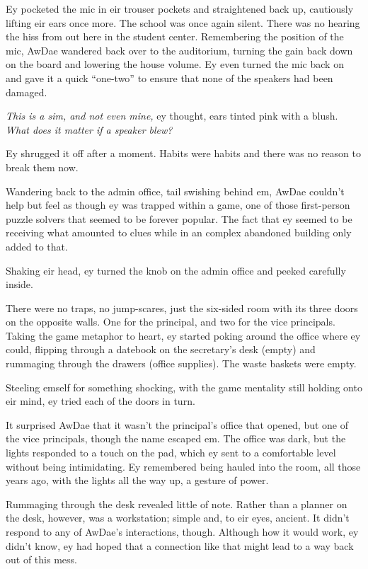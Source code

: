Ey pocketed the mic in eir trouser pockets and straightened back up, cautiously lifting eir ears once more. The school was once again silent. There was no hearing the hiss from out here in the student center. Remembering the position of the mic, AwDae wandered back over to the auditorium, turning the gain back down on the board and lowering the house volume. Ey even turned the mic back on and gave it a quick ``one-two'' to ensure that none of the speakers had been damaged.

\emph{This is a sim, and not even mine,} ey thought, ears tinted pink with a blush. \emph{What does it matter if a speaker blew?}

Ey shrugged it off after a moment. Habits were habits and there was no reason to break them now.

Wandering back to the admin office, tail swishing behind em, AwDae couldn't help but feel as though ey was trapped within a game, one of those first-person puzzle solvers that seemed to be forever popular. The fact that ey seemed to be receiving what amounted to clues while in an complex abandoned building only added to that.

Shaking eir head, ey turned the knob on the admin office and peeked carefully inside.

There were no traps, no jump-scares, just the six-sided room with its three doors on the opposite walls. One for the principal, and two for the vice principals. Taking the game metaphor to heart, ey started poking around the office where ey could, flipping through a datebook on the secretary's desk (empty) and rummaging through the drawers (office supplies). The waste baskets were empty.

Steeling emself for something shocking, with the game mentality still holding onto eir mind, ey tried each of the doors in turn.

It surprised AwDae that it wasn't the principal's office that opened, but one of the vice principals, though the name escaped em. The office was dark, but the lights responded to a touch on the pad, which ey sent to a comfortable level without being intimidating. Ey remembered being hauled into the room, all those years ago, with the lights all the way up, a gesture of power.

Rummaging through the desk revealed little of note. Rather than a planner on the desk, however, was a workstation; simple and, to eir eyes, ancient. It didn't respond to any of AwDae's interactions, though. Although how it would work, ey didn't know, ey had hoped that a connection like that might lead to a way back out of this mess.

